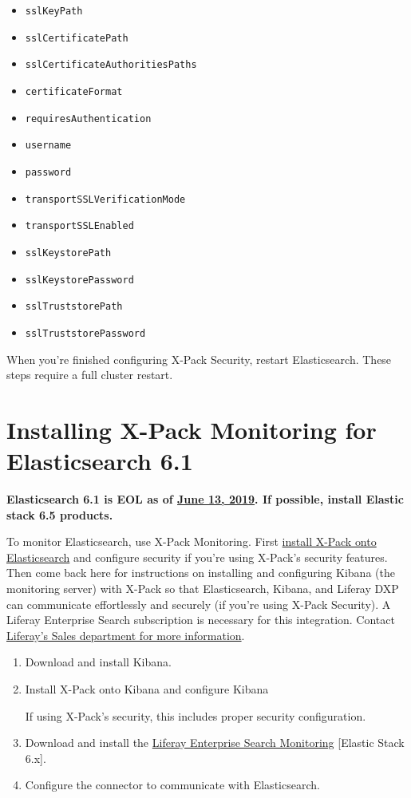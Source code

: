 \begin{itemize}
\tightlist
\item
  \texttt{sslKeyPath}
\item
  \texttt{sslCertificatePath}
\item
  \texttt{sslCertificateAuthoritiesPaths}
\item
  \texttt{certificateFormat}
\item
  \texttt{requiresAuthentication}
\item
  \texttt{username}
\item
  \texttt{password}
\item
  \texttt{transportSSLVerificationMode}
\item
  \texttt{transportSSLEnabled}
\item
  \texttt{sslKeystorePath}
\item
  \texttt{sslKeystorePassword}
\item
  \texttt{sslTruststorePath}
\item
  \texttt{sslTruststorePassword}
\end{itemize}

When you're finished configuring X-Pack Security, restart Elasticsearch.
These steps require a full cluster restart.

\section{Installing X-Pack Monitoring for Elasticsearch
6.1}\label{installing-x-pack-monitoring-for-elasticsearch-6.1}

\textbf{Elasticsearch 6.1 is EOL as of
\href{https://www.elastic.co/support/eol}{June 13, 2019}. If possible,
install Elastic stack 6.5 products.}

To monitor Elasticsearch, use X-Pack Monitoring. First
\href{/docs/7-0/deploy/-/knowledge_base/d/securing-elasticsearch-6-with-x-pack}{install
X-Pack onto Elasticsearch} and configure security if you're using
X-Pack's security features. Then come back here for instructions on
installing and configuring Kibana (the monitoring server) with X-Pack so
that Elasticsearch, Kibana, and Liferay DXP can communicate effortlessly
and securely (if you're using X-Pack Security). A Liferay Enterprise
Search subscription is necessary for this integration. Contact
\href{https://www.liferay.com/contact-us\#contact-sales}{Liferay's Sales
department for more information}.

\begin{enumerate}
\def\labelenumi{\arabic{enumi}.}
\item
  Download and install Kibana.
\item
  Install X-Pack onto Kibana and configure Kibana

  If using X-Pack's security, this includes proper security
  configuration.
\item
  Download and install the
  \href{https://www.liferay.com/marketplace}{Liferay Enterprise Search
  Monitoring} {[}Elastic Stack 6.x{]}.
\item
  Configure the connector to communicate with Elasticsearch.
\end{enumerate}

